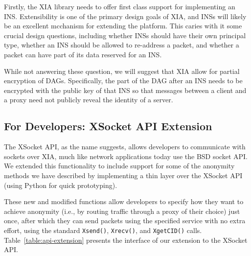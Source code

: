 \documentclass{article}
\begin{document}
Firstly, the XIA library needs to offer first class support for implementing an INS.  Extensibility is one of the primary design goals of XIA, and INSs will likely be an excellent mcchanism for extending the platform.  This caries with it some crucial design questions, including whether INSs should have their own principal type, whether an INS should be allowed to re-address a packet, and whether a packet can have part of its data reserved for an INS.  

While not answering these question, we will suggest that XIA allow for partial encryption of DAGs.  Specifically, the part of the DAG after an INS needs to be encrypted with the public key of that INS so that messages between a client and a proxy need not publicly reveal the identity of a server.

\subsection{For Developers: XSocket API Extension}
\label{api}
The XSocket API, as the name suggests, allows developers to communicate with sockets over XIA, much like network applications today use the BSD socket API. We extended this functionality to include support for some of the anonymity methods we have described by implementing a thin layer over the XSocket API (using Python for quick prototyping).

These new and modified functions allow developers to specify how they want to achieve anonymity (i.e., by routing traffic through a proxy of their choice) just once, after which they can send packets using the specified service with no extra effort, using the standard \texttt{Xsend()}, \texttt{Xrecv()}, and \texttt{XgetCID()} calls. Table~\ref{table:api-extension} presents the interface of our extension to the XSocket API.
\end{document}
